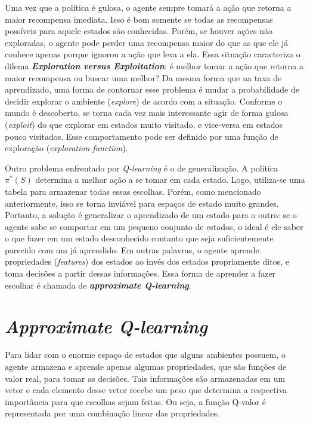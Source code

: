 Uma vez que a política é gulosa, o agente sempre tomará a ação que retorna a maior recompensa imediata.
Isso é bom somente se todas as recompensas possíveis para aquele estados são conhecidas.
Porém, se houver ações não exploradas, o agente pode perder uma recompensa maior do que as que ele já conhece apenas porque ignorou a ação que leva a ela.
Essa situação caracteriza o dilema \textbf{\textit{Exploration versus Exploitation}}: é melhor tomar a ação que retorna a maior recompensa ou buscar uma melhor?
Da mesma forma que na taxa de aprendizado, uma forma de contornar esse problema é mudar a probabilidade de decidir explorar o ambiente (\textit{explore}) de acordo com a situação.
Conforme o mundo é descoberto, se torna cada vez mais interessante agir de forma gulosa (\textit{exploit}) do que explorar em estados muito visitado, e vice-versa em estados pouco visitados.
Esse comportamento pode ser definido por uma função de exploração (\textit{exploration function}).

Outro problema enfrentado por \textit{Q-learning} é o de generalização. A política $\pi^{*}(S)$ determina a melhor ação a se tomar em cada estado. Logo, utiliza-se uma tabela para armazenar todas essas escolhas. Porém, como mencionado anteriormente, isso se torna inviável para espaços de estado muito grandes. Portanto, a solução é generalizar o aprendizado de um estado para o outro: se o agente sabe se comportar em um pequeno conjunto de estados, o ideal é ele saber o que fazer em um estado desconhecido contanto que seja suficientemente parecido com um já aprendido. Em outras palavras, o agente aprende propriedades (\textit{features}) dos estados ao invés dos estados propriamente ditos, e toma decisões a partir dessas informações. Essa forma de aprender a fazer escolhar é chamada de \textit{\textbf{approximate Q-learning}}.


\section{\textit{Approximate Q-learning}}
\label{sec:aql}

Para lidar com o enorme espaço de estados que alguns ambientes possuem, o agente armazena e aprende apenas algumas propriedades, que são funções de valor real, para tomar as decisões. Tais informações são armazenadas em um vetor e cada elemento desse vetor recebe um peso que determina a respectiva importância para que escolhas sejam feitas. Ou seja, a função Q-valor é representada por uma combinação linear das propriedades.

